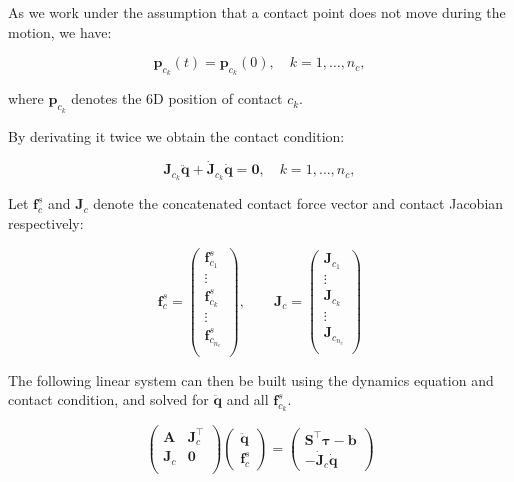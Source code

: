 As we work under the assumption that a contact point does not move
during the motion, we have:

\begin{equation}
\mathbf{p}_{c_k}(t)=\mathbf{p}_{c_k}(0),\quad k = 1,\ldots,n_c,
\end{equation}

where $\mathbf{p}_{c_k}$ denotes the 6D position of contact $c_k$.

By derivating it twice we obtain the contact condition:

\begin{equation}
\mathbf{J}_{c_k}\ddot{\mathbf{q}} +
\dot{\mathbf{J}}_{c_k}\dot{\mathbf{q}}=\mathbf{0}, \quad k = 1,\ldots,n_c,
\end{equation}

Let $\mathbf{f}^s_c$ and $\mathbf{J}_c$ denote the concatenated
contact force vector and contact Jacobian respectively:

\begin{equation}
\mathbf{f}^s_c=
\left(\begin{matrix}
\mathbf{f}^s_{c_1}\\
\vdots\\
\mathbf{f}^s_{c_k}\\
\vdots\\
\mathbf{f}^s_{c_{n_c}}\\
\end{matrix}\right),
\qquad
\mathbf{J}_c=
\left(\begin{matrix}
\mathbf{J}_{c_1}\\
\vdots\\
\mathbf{J}_{c_k}\\
\vdots\\
\mathbf{J}_{c_{n_c}}\\
\end{matrix}\right)
\end{equation}

The following linear system can then be built using the dynamics
equation and contact condition, and solved for $\ddot{\mathbf{q}}$ and
all $\mathbf{f}^s_{c_k}$.

\begin{equation}
  \left(\begin{matrix}
    \mathbf{A} & \mathbf{J}_{c}^\top \\
    \mathbf{J}_{c} & \mathbf{0}\\
  \end{matrix}\right)
  \left(\begin{matrix}
  \ddot{\mathbf{q}}\\
  \mathbf{f}^s_{c}
  \end{matrix}\right)
  = \left(\begin{matrix} \mathbf{S}^\top\boldsymbol{\tau}-\mathbf{b}
    \\ -\dot{\mathbf{J}}_{c}\dot{\mathbf{q}}
  \end{matrix}\right)
\end{equation}

